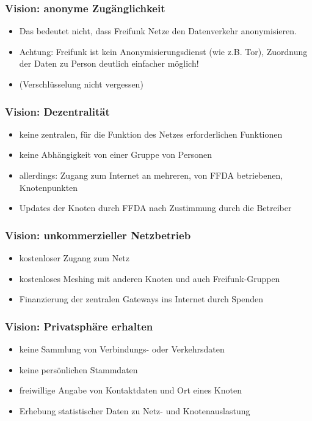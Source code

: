 \documentclass[10pt]{beamer}
\begin{document}
\begin{frame}
	\frametitle{Vision: anonyme Zugänglichkeit}
	
	\begin{itemize}[<+->]
		\item Das bedeutet nicht, dass Freifunk Netze den Datenverkehr anonymisieren.
		\item Achtung: Freifunk ist kein Anonymisierungsdienst (wie z.B. Tor), Zuordnung der Daten zu Person deutlich einfacher möglich!
		\item (Verschlüsselung nicht vergessen)
	\end{itemize}
\end{frame}

\begin{frame}
	\frametitle{Vision: Dezentralität}
	
	\begin{itemize}[<+->]
		\item keine zentralen, für die Funktion des Netzes erforderlichen Funktionen
		\item keine Abhängigkeit von einer Gruppe von Personen
		\item allerdings: Zugang zum Internet an mehreren, von FFDA betriebenen, Knotenpunkten
		\item Updates der Knoten durch FFDA nach Zustimmung durch die Betreiber
	\end{itemize}
\end{frame}

\begin{frame}
	\frametitle{Vision: unkommerzieller Netzbetrieb}
	
	\begin{itemize}[<+->]
		\item kostenloser Zugang zum Netz
		\item kostenloses Meshing mit anderen Knoten und auch Freifunk-Gruppen
		\item Finanzierung der zentralen Gateways ins Internet durch Spenden
	\end{itemize}
\end{frame}

\begin{frame}
	\frametitle{Vision: Privatsphäre erhalten}
	\begin{itemize}[<+->]
		\item keine Sammlung von Verbindungs- oder Verkehrsdaten
		\item keine persönlichen Stammdaten
		\item freiwillige Angabe von Kontaktdaten und Ort eines Knoten
		\item Erhebung statistischer Daten zu Netz- und Knotenauslastung
	\end{itemize}
\end{frame}
\end{document}
